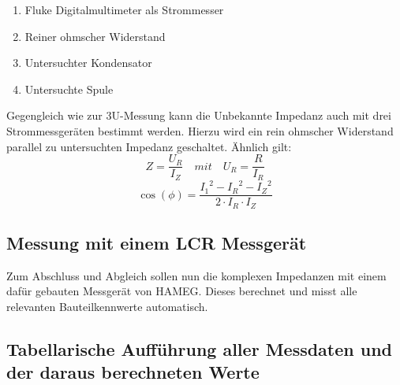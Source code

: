 \documentclass{article}
\begin{document}
\begin{enumerate}
	\item Fluke Digitalmultimeter als Strommesser
	\item Reiner ohmscher Widerstand
	\item Untersuchter Kondensator
	\item Untersuchte Spule
\end{enumerate}

Gegengleich wie zur 3U-Messung kann die Unbekannte Impedanz auch mit drei Strommessgeräten bestimmt werden. Hierzu wird ein rein ohmscher Widerstand parallel zu untersuchten Impedanz geschaltet.
Ähnlich gilt:
\[
	Z = \frac{U_R}{I_Z} \quad mit \quad U_R = \frac{R}{I_R}
\]
\[
	\cos(\phi) = \frac{{I_1}^2 - {I_R}^2 - {I_Z}^2}						{ 2 \cdot I_R \cdot I_Z}
\]

\subsection{Messung mit einem LCR Messgerät}
Zum Abschluss und Abgleich sollen nun die komplexen Impedanzen mit einem dafür gebauten Messgerät von HAMEG. Dieses berechnet und misst alle relevanten Bauteilkennwerte automatisch.

\subsection{Tabellarische Aufführung aller Messdaten und der daraus berechneten Werte}
\end{document}
